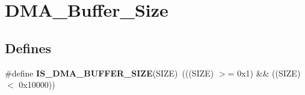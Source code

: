 \hypertarget{group__DMA__Buffer__Size}{
\section{DMA\_\-Buffer\_\-Size}
\label{group__DMA__Buffer__Size}
}
\subsection*{Defines}
\begin{DoxyCompactItemize}
\item 
\hypertarget{group__DMA__Buffer__Size_ga72ef4033bb3bc2cdfdbe579083b05e32}{
\#define {\bfseries IS\_\-DMA\_\-BUFFER\_\-SIZE}(SIZE)~(((SIZE) $>$= 0x1) \&\& ((SIZE) $<$ 0x10000))}
\label{group__DMA__Buffer__Size_ga72ef4033bb3bc2cdfdbe579083b05e32}

\end{DoxyCompactItemize}

